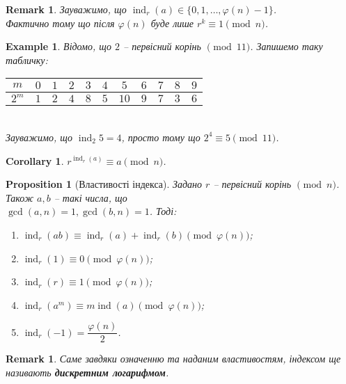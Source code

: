\documentclass[a4paper, 14pt]{extarticle}
\theoremstyle{theoremdd}
\theoremstyle{theoremdd}
\theoremstyle{theoremdd}
\theoremstyle{theoremdd}
\newtheorem{example}[theorem]{Example}
\theoremstyle{theoremdd}
\newtheorem{proposition}[theorem]{Proposition}
\theoremstyle{theoremdd}
\newtheorem{remark}[theorem]{Remark}
\theoremstyle{theoremdd}
\theoremstyle{theoremdd}
\newtheorem{corollary}[theorem]{Corollary}
\DeclareMathOperator{\ind}{ind}
\begin{document}
\begin{remark}
Зауважимо, що $\ind_r (a) \in \{0,1,\dots,\varphi(n)-1\}$.\\
Фактично тому що після $\varphi(n)$ буде лише $r^k \equiv 1 \pmod n$.
\end{remark}

\begin{example}
Відомо, що $2$ -- первісний корінь $\!\! \pmod {11}$. Запишемо таку табличку:\\
\begin{tabular}{c|c|c|c|c|c|c|c|c|c|c}
$m$ & $0$ & $1$ & $2$ & $3$ & $4$ & $5$ & $6$ & $7$ & $8$ & $9$ \\
\hline
$2^m$ & $1$ & $2$ & $4$ & $8$ & $5$ & $10$ & $9$ & $7$ & $3$ & $6$
\end{tabular}\\
Зауважимо, що $\ind_2 5 = 4$, просто тому що $2^4 \equiv 5 \pmod {11}$.
\end{example}

\begin{corollary}
$r^{\ind_r(a)} \equiv a \pmod n$.
\end{corollary}

\begin{proposition}[Властивості індекса]
Задано $r$ -- первісний корінь $\pmod n$. Також $a,b$ -- такі числа, що \\ $\gcd(a,n)=1,\gcd(b,n)=1$. Тоді:
\begin{enumerate}[nosep,wide=0pt,label={\arabic*)}]
\item $\ind_r(ab) \equiv \ind_r(a) + \ind_r(b) \pmod {\varphi(n)}$;
\item $\ind_r (1) \equiv 0 \pmod {\varphi(n)}$;
\item $\ind_r (r) \equiv 1 \pmod {\varphi(n)}$;
\item $\ind_r (a^m) \equiv m \ind (a) \pmod {\varphi(n)}$;
\item $\ind_r(-1) = \dfrac{\varphi(n)}{2}$.
\end{enumerate}
\end{proposition}

\begin{remark}
Саме завдяки означенню та наданим властивостям, індексом ще називають \textbf{дискретним логарифмом}.
\end{remark}
\end{document}

